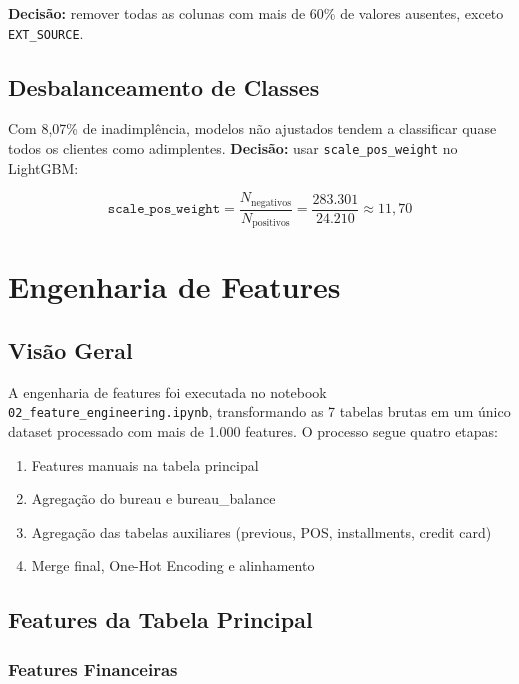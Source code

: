 \documentclass[12pt, a4paper]{article}
\begin{document}
\textbf{Decis\~ao:} remover todas as colunas com mais de 60\% de valores ausentes,
exceto \texttt{EXT\_SOURCE}.

\subsection{Desbalanceamento de Classes}

Com 8,07\% de inadimpl\^encia, modelos n\~ao ajustados tendem a classificar quase todos
os clientes como adimplentes. \textbf{Decis\~ao:} usar \texttt{scale\_pos\_weight} no
LightGBM:

\begin{equation}
    \texttt{scale\_pos\_weight} = \frac{N_{\text{negativos}}}{N_{\text{positivos}}}
    = \frac{283{.}301}{24{.}210} \approx 11{,}70
\end{equation}

\section{Engenharia de Features}

\subsection{Vis\~ao Geral}

A engenharia de features foi executada no notebook \texttt{02\_feature\_engineering.ipynb},
transformando as 7 tabelas brutas em um \'unico dataset processado com mais de 1.000
features. O processo segue quatro etapas:

\begin{enumerate}
    \item Features manuais na tabela principal
    \item Agrega\c{c}\~ao do bureau e bureau\_balance
    \item Agrega\c{c}\~ao das tabelas auxiliares (previous, POS, installments, credit card)
    \item Merge final, One-Hot Encoding e alinhamento
\end{enumerate}

\subsection{Features da Tabela Principal}

\subsubsection{Features Financeiras}
\end{document}
